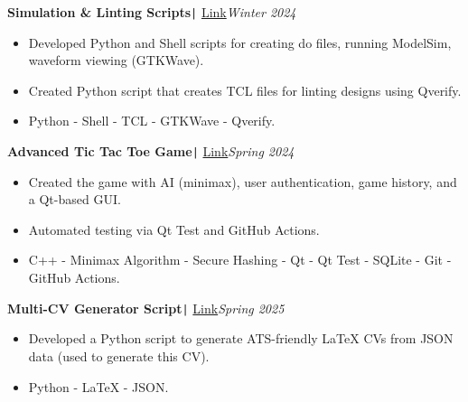 \documentclass[11pt,a4paper]{article}
\begin{document}
\vspace{-0.3cm}
\begin{flushleft}
\textbf{Simulation \& Linting Scripts}\texttt{|} {\href{https://github.com/salah0eldin/Scripts}{Link}}\hfill\textit{Winter 2024}\\
\end{flushleft}
\vspace{-0.6cm}
\begin{itemize}
\item \setlength{\itemsep}{-0.0em} Developed Python and Shell scripts for creating do files, running ModelSim, waveform viewing (GTKWave).
\item \setlength{\itemsep}{-0.0em} Created Python script that creates TCL files for linting designs using Qverify.
\item \setlength{\itemsep}{-0.0em} Python - Shell - TCL - GTKWave - Qverify.
\end{itemize}
\vspace{-0.3cm}
\begin{flushleft}
\textbf{Advanced Tic Tac Toe Game}\texttt{|} {\href{https://www.linkedin.com/posts/salah-eldin-hassen-5bba10250_qt-cplusplus-softwaredevelopment-activity-7227345922031009793-xhzd/?rcm=ACoAAD4WDF8Bk9P5oS-irdrlv53Rzjd03ps4OSA}{Link}}\hfill\textit{Spring 2024}\\
\end{flushleft}
\vspace{-0.6cm}
\begin{itemize}
\item \setlength{\itemsep}{-0.0em} Created the game with AI (minimax), user authentication, game history, and a Qt-based GUI.
\item \setlength{\itemsep}{-0.0em} Automated testing via Qt Test and GitHub Actions.
\item \setlength{\itemsep}{-0.0em} C++ - Minimax Algorithm - Secure Hashing - Qt - Qt Test - SQLite - Git - GitHub Actions.
\end{itemize}
\vspace{-0.3cm}
\begin{flushleft}
\textbf{Multi-CV Generator Script}\texttt{|} {\href{https://github.com/salah0eldin/CV}{Link}}\hfill\textit{Spring 2025}\\
\end{flushleft}
\vspace{-0.6cm}
\begin{itemize}
\item \setlength{\itemsep}{-0.0em} Developed a Python script to generate ATS-friendly LaTeX CVs from JSON data (used to generate this CV).
\item \setlength{\itemsep}{-0.0em} Python - LaTeX - JSON.
\end{itemize}
\end{document}

